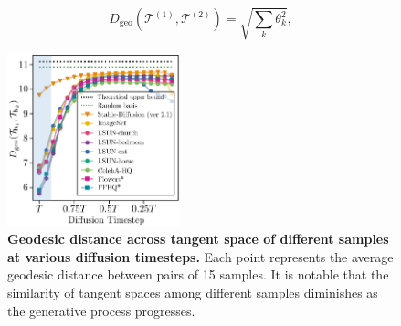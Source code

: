 

\begin{equation}
D_{\text{geo}}(\mathcal{T}^{(1)}, \mathcal{T}^{(2)}) = \sqrt{\sum_k \theta_k^2},
\end{equation}


\begin{figure}
\includegraphics[width=5cm, center]{figure/Homogenity_samples.pdf}
    \vspace{-1em}
    \caption{
    \textbf{Geodesic distance across tangent space of different samples {at} various diffusion timesteps.}
    Each point represents the average geodesic distance between pairs of 15 samples.
    { It is notable that the similarity of tangent spaces among different samples diminishes as the generative process progresses.}
    }
    \label{homogenity-sample}
\vspace{-3em}
\label{fig:homo}
\end{figure}


